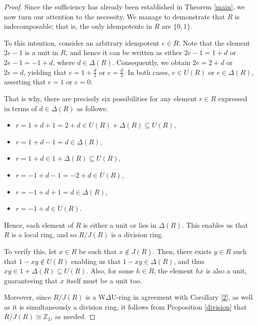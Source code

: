 \documentclass[12pt]{amsart}
\theoremstyle{definition}
\begin{document}
\begin{proof}
Since the sufficiency has already been established in Theorem \ref{main}, we now turn our attention to the necessity. We manage to demonstrate that \( R \) is indecomposable; that is, the only idempotents in \( R \) are \( \{0, 1\} \).

To this intention, consider an arbitrary idempotent \( e \in R \). Note that the element \( 2e - 1 \) is a unit in \( R \), and hence it can be written as either \( 2e - 1 = 1 + d \) or \( 2e - 1 = -1 + d \), where \( d \in \Delta(R) \). Consequently, we obtain \( 2e = 2 + d \) or \( 2e = d \), yielding that \( e = 1 + \frac{d}{2} \) or \( e = \frac{d}{2} \). In both cases, \( e \in U(R) \) or \( e \in \Delta(R) \), asserting that \( e = 1 \) or \( e = 0 \).

That is why, there are precisely six possibilities for any element \( r \in R \) expressed in terms of \( d \in \Delta(R) \) as follows:

\medskip

\begin{itemize}
	\item \( r = 1 + d + 1 = 2 + d \in U(R) + \Delta(R) \subseteq U(R) \),
	\item \( r = 1 + d - 1 = d \in \Delta(R) \),
	\item \( r = 1 + d \in 1 + \Delta(R) \subseteq U(R) \),
	\item \( r = -1 + d - 1 = -2 + d \in U(R) \),
	\item \( r = -1 + d + 1 = d \in \Delta(R) \),
	\item \( r = -1 + d \in U(R) \).
\end{itemize}

\medskip

Hence, each element of \( R \) is either a unit or lies in \( \Delta(R) \). This enables us that \( R \) is a local ring, and so \( R/J(R) \) is a division ring.

To verify this, let \( x \in R \) be such that \( x \not\in J(R) \). Then, there exists \( y \in R \) such that \( 1 - xy \not\in U(R) \) enabling us that \( 1 - xy \in \Delta(R) \), and thus \( xy \in 1 + \Delta(R) \subseteq U(R) \). Also, for some \( h \in R \), the element \( hx \) is also a unit, guaranteeing that \( x \) itself must be a unit too.

Moreover, since \( R/J(R) \) is a W\(\Delta\)U-ring in agreement with Corollary \ref{2}, as well as it is simultaneously a division ring, it follows from Proposition \ref{division} that \( R/J(R) \cong \mathbb{Z}_3 \), as needed.
\end{proof}
\end{document}
